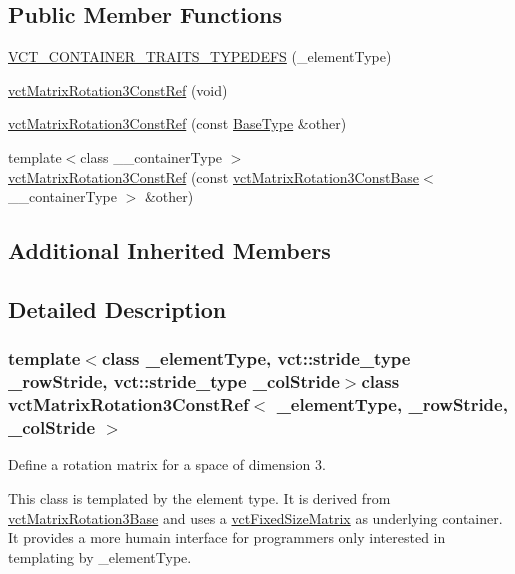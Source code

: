 \subsection*{Public Member Functions}
\begin{DoxyCompactItemize}
\item 
\hyperlink{classvct_matrix_rotation3_const_ref_af7c1f7d2b90c7d3b95a83df38fe19197}{V\-C\-T\-\_\-\-C\-O\-N\-T\-A\-I\-N\-E\-R\-\_\-\-T\-R\-A\-I\-T\-S\-\_\-\-T\-Y\-P\-E\-D\-E\-F\-S} (\-\_\-element\-Type)
\item 
\hyperlink{classvct_matrix_rotation3_const_ref_a9c17ae86f86673a157ce4c1b22582c2f}{vct\-Matrix\-Rotation3\-Const\-Ref} (void)
\item 
\hyperlink{classvct_matrix_rotation3_const_ref_acbe5e3ef35e6f173fbb6ed1b77a57850}{vct\-Matrix\-Rotation3\-Const\-Ref} (const \hyperlink{classvct_matrix_rotation3_const_ref_a72312c3cf0fe6a145043764cdd412bad}{Base\-Type} \&other)
\item 
{\footnotesize template$<$class \-\_\-\-\_\-container\-Type $>$ }\\\hyperlink{classvct_matrix_rotation3_const_ref_a0f14b8f77d86821584eb76c0fb395cab}{vct\-Matrix\-Rotation3\-Const\-Ref} (const \hyperlink{classvct_matrix_rotation3_const_base}{vct\-Matrix\-Rotation3\-Const\-Base}$<$ \-\_\-\-\_\-container\-Type $>$ \&other)
\end{DoxyCompactItemize}
\subsection*{Additional Inherited Members}


\subsection{Detailed Description}
\subsubsection*{template$<$class \-\_\-element\-Type, vct\-::stride\-\_\-type \-\_\-row\-Stride, vct\-::stride\-\_\-type \-\_\-col\-Stride$>$class vct\-Matrix\-Rotation3\-Const\-Ref$<$ \-\_\-element\-Type, \-\_\-row\-Stride, \-\_\-col\-Stride $>$}

Define a rotation matrix for a space of dimension 3. 

This class is templated by the element type. It is derived from \hyperlink{classvct_matrix_rotation3_base}{vct\-Matrix\-Rotation3\-Base} and uses a \hyperlink{classvct_fixed_size_matrix}{vct\-Fixed\-Size\-Matrix} as underlying container. It provides a more humain interface for programmers only interested in templating by \-\_\-element\-Type.


